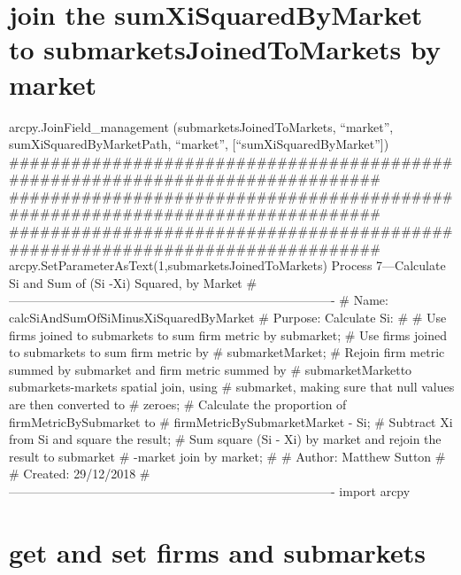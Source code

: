 \documentclass[]{article}
\begin{document}
\section{join the sumXiSquaredByMarket to submarketsJoinedToMarkets by
market}\label{join-the-sumxisquaredbymarket-to-submarketsjoinedtomarkets-by-market}

arcpy.JoinField\_management (submarketsJoinedToMarkets, ``market'',
sumXiSquaredByMarketPath, ``market'', {[}``sumXiSquaredByMarket''{]})
\#\#\#\#\#\#\#\#\#\#\#\#\#\#\#\#\#\#\#\#\#\#\#\#\#\#\#\#\#\#\#\#\#\#\#\#\#\#\#\#\#\#\#\#\#\#\#\#\#\#\#\#\#\#\#\#\#\#\#\#\#\#\#\#\#\#\#\#\#\#\#\#\#\#\#\#\#\#\#
\#\#\#\#\#\#\#\#\#\#\#\#\#\#\#\#\#\#\#\#\#\#\#\#\#\#\#\#\#\#\#\#\#\#\#\#\#\#\#\#\#\#\#\#\#\#\#\#\#\#\#\#\#\#\#\#\#\#\#\#\#\#\#\#\#\#\#\#\#\#\#\#\#\#\#\#\#\#\#
\#\#\#\#\#\#\#\#\#\#\#\#\#\#\#\#\#\#\#\#\#\#\#\#\#\#\#\#\#\#\#\#\#\#\#\#\#\#\#\#\#\#\#\#\#\#\#\#\#\#\#\#\#\#\#\#\#\#\#\#\#\#\#\#\#\#\#\#\#\#\#\#\#\#\#\#\#\#\#
arcpy.SetParameterAsText(1,submarketsJoinedToMarkets) Process
7---Calculate Si and Sum of (Si -Xi) Squared, by Market
\#-------------------------------------------------------------------------------
\# Name: calcSiAndSumOfSiMinusXiSquaredByMarket \# Purpose: Calculate
Si: \# \# Use firms joined to submarkets to sum firm metric by
submarket; \# Use firms joined to submarkets to sum firm metric by \#
submarketMarket; \# Rejoin firm metric summed by submarket and firm
metric summed by \# submarketMarketto submarkets-markets spatial join,
using \# submarket, making sure that null values are then converted to
\# zeroes; \# Calculate the proportion of firmMetricBySubmarket to \#
firmMetricBySubmarketMarket - Si; \# Subtract Xi from Si and square the
result; \# Sum square (Si - Xi) by market and rejoin the result to
submarket \# -market join by market; \# \# Author: Matthew Sutton \# \#
Created: 29/12/2018
\#-------------------------------------------------------------------------------
import arcpy

\section{get and set firms and
submarkets}\label{get-and-set-firms-and-submarkets}
\end{document}
